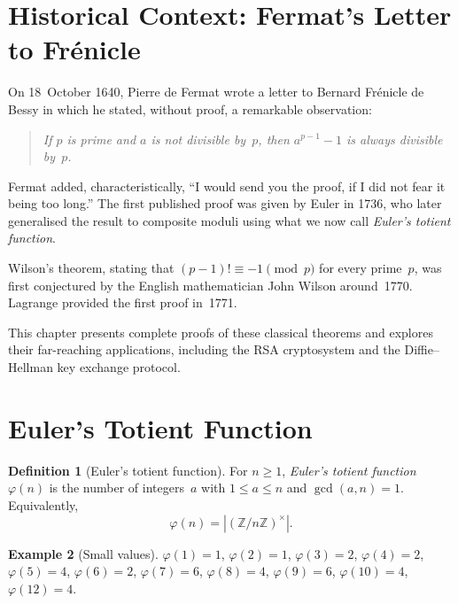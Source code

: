 \documentclass[12pt,a4paper,openany]{book}
\theoremstyle{definition}
\newtheorem{definition}{Definition}[chapter]
\newtheorem{example}[definition]{Example}
\theoremstyle{plain}
\theoremstyle{remark}
\newcommand{\Z}{\mathbb{Z}}
\newcommand{\abs}[1]{\left|#1\right|}
\begin{document}
\section{Historical Context: Fermat's Letter to Frénicle}
\label{sec:fermat-frenicle}

On 18~October 1640, Pierre de Fermat wrote a letter to Bernard Frénicle de
Bessy in which he stated, without proof, a remarkable observation:
\begin{quote}
\itshape
If $p$ is prime and $a$ is not divisible by~$p$, then $a^{p-1} - 1$ is
always divisible by~$p$.
\end{quote}
Fermat added, characteristically, ``I would send you the proof, if I did
not fear it being too long.''  The first published proof was given by
Euler in 1736, who later generalised the result to
composite moduli using what we now call \emph{Euler's totient function}.

Wilson's theorem, stating that $(p-1)! \equiv -1
\pmod{p}$ for every prime~$p$, was first conjectured by the English
mathematician John Wilson around~1770.  Lagrange
provided the first proof in~1771.

This chapter presents complete proofs of these classical theorems and
explores their far-reaching applications, including the RSA cryptosystem
and the Diffie--Hellman key exchange protocol.

\section{Euler's Totient Function}
\label{sec:euler-totient}

\begin{definition}[Euler's totient function]
\label{def:euler-totient}
For $n \ge 1$, \emph{Euler's totient function} $\varphi(n)$
is the number of integers~$a$ with $1 \le a \le n$ and $\gcd(a,n) = 1$.
Equivalently,
\[
  \varphi(n) = \abs{(\Z/n\Z)^\times}.
\]
\end{definition}

\begin{example}[Small values]
\label{ex:totient-small}
$\varphi(1) = 1$, $\varphi(2) = 1$, $\varphi(3) = 2$, $\varphi(4) = 2$,
$\varphi(5) = 4$, $\varphi(6) = 2$, $\varphi(7) = 6$, $\varphi(8) = 4$,
$\varphi(9) = 6$, $\varphi(10) = 4$, $\varphi(12) = 4$.
\end{example}
\end{document}
